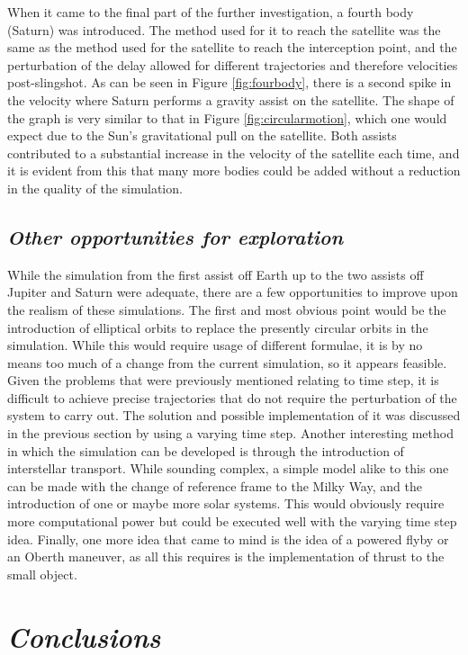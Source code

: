 \documentclass[12pt, english]{report}
\makeatletter
\renewcommand{\cftchappresnum}{Chapter }
\newcommand*\updatechaptername{%
	\addtocontents{toc}{\protect\renewcommand*\protect\cftchappresnum{\@chapapp\ }}
}
\renewcommand{\thefigure}{\Roman{chapter}.\arabic{figure}}
\renewcommand{\thetable}{\Roman{chapter}.\arabic{table}}
\makeatother
\begin{document}
{When it came to the final part of the further investigation, a fourth body (Saturn) was introduced. The method used for it to reach the satellite was the same as the method used for the satellite to reach the interception point, and the perturbation of the delay allowed for different trajectories and therefore velocities post-slingshot. As can be seen in Figure \ref{fig:fourbody}, there is a second spike in the velocity where Saturn performs a gravity assist on the satellite. The shape of the graph is very similar to that in Figure \ref{fig:circularmotion}, which one would expect due to the Sun's gravitational pull on the satellite. Both assists contributed to a substantial increase in the velocity of the satellite each time, and it is evident from this that many more bodies could be added without a reduction in the quality of the simulation.
}

\section{\textsl{Other opportunities for exploration}}
\normalsize{\noindent While the simulation from the first assist off Earth up to the two assists off Jupiter and Saturn were adequate, there are a few opportunities to improve upon the realism of these simulations. The first and most obvious point would be the introduction of elliptical orbits to replace the presently circular orbits in the simulation. While this would require usage of different formulae, it is by no means too much of a change from the current simulation, so it appears feasible. Given the problems that were previously mentioned relating to time step, it is difficult to achieve precise trajectories that do not require the perturbation of the system to carry out. The solution and possible implementation of it was discussed in the previous section by using a varying time step. Another interesting method in which the simulation can be developed is through the introduction of interstellar transport. While sounding complex, a simple model alike to this one can be made with the change of reference frame to the Milky Way, and the introduction of one or maybe more solar systems. This would obviously require more computational power but could be executed well with the varying time step idea. Finally, one more idea that came to mind is the idea of a powered flyby or an Oberth maneuver, as all this requires is the implementation of thrust to the small object. }

%

\chapter{\textsl{Conclusions}}

%

\newpage



\clearpage

\renewcommand{\thefigure}{\Alph{chapter}.\arabic{figure}}
\renewcommand{\thetable}{\Alph{chapter}.\arabic{table}}

\updatechaptername
%
\end{document}
